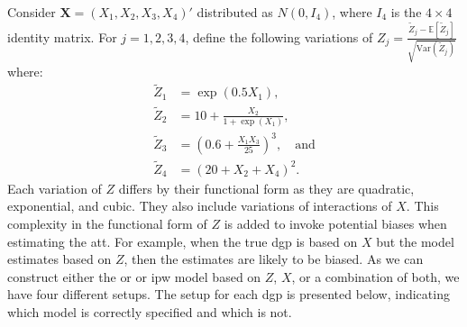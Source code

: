 Consider $\mathbf{X} = (X_1, X_2, X_3, X_4)'$ distributed as $N(0, I_4)$, where $I_4$ is the $4 \times 4$ identity matrix.
For $j = 1, 2, 3, 4$, \citet{kang2007demystifying} define the following variations of $Z_j = \frac{\tilde{Z}_j - \mathbb{E}[\tilde{Z}_j]}{\sqrt{\text{Var}(\tilde{Z}_j)}}$ where:
\begin{align} \nonumber
\tilde{Z}_1 &= \exp(0.5X_1), \\ \nonumber
\tilde{Z}_2 &= 10 + \frac{X_2}{1 + \exp(X_1)}, \\
\tilde{Z}_3 &= (0.6 + \frac{X_1 X_3}{25})^3, \quad \text{and} \\ \nonumber
\tilde{Z}_4 &= (20 + X_2 + X_4)^2.  \nonumber
\label{eq:13}
\end{align}
Each variation of $Z$ differs by their functional form as they are quadratic, exponential, and cubic.
They also include variations of interactions of $X$.
This complexity in the functional form of $Z$ is added to invoke potential biases when estimating the \ac{att}.
For example, when the true \ac{dgp} is based on $X$ but the model estimates based on $Z$, then the estimates are likely to be biased.
As we can construct either the \ac{or} or \ac{ipw} model based on $Z$, $X$, or a combination of both, we have four different setups.
The setup for each \ac{dgp} is presented below, indicating which model is correctly specified and which is not.
